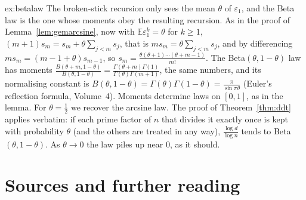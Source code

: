 \begin{solution}{ex:betalaw}
\idea The broken-stick recursion only sees the mean $\theta$ of $\varepsilon_1$, and the Beta law is the one whose moments obey the resulting recursion.
\writeup As in the proof of Lemma~\ref{lem:gemarcsine}, now with $\mathbb E\varepsilon_1^k=\theta$ for $k\ge1$, $(m+1)s_m=s_m+\theta\sum_{j<m}s_j$, that is $ms_m=\theta\sum_{j<m}s_j$, and by differencing $ms_m=(m-1+\theta)s_{m-1}$, so $s_m=\frac{\theta(\theta+1)\cdots(\theta+m-1)}{m!}$. The Beta$(\theta,1-\theta)$ law has moments $\frac{B(\theta+m,1-\theta)}{B(\theta,1-\theta)}=\frac{\Gamma(\theta+m)\Gamma(1)}{\Gamma(\theta)\Gamma(m+1)}$, the same numbers, and its normalising constant is $B(\theta,1-\theta)=\Gamma(\theta)\Gamma(1-\theta)=\frac\pi{\sin\pi\theta}$ (Euler's reflection formula, Volume~4). Moments determine laws on $[0,1]$, as in the lemma. For $\theta=\frac12$ we recover the arcsine law. The proof of Theorem~\ref{thm:ddt} applies verbatim: if each prime factor of $n$ that divides it exactly once is kept with probability $\theta$ (and the others are treated in any way), $\frac{\log d}{\log n}$ tends to Beta$(\theta,1-\theta)$. As $\theta\to0$ the law piles up near $0$, as it should.
\end{solution}

\section*{Sources and further reading}

